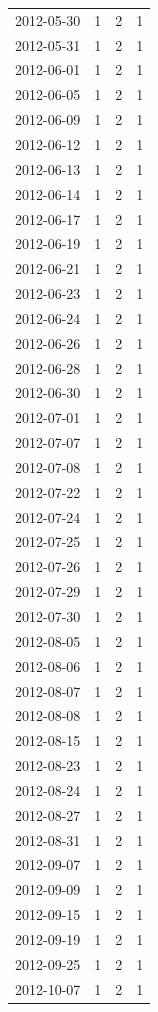 \begin{tabular}{lrrr}
2012-05-30 & 1 & 2 & 1 \\
2012-05-31 & 1 & 2 & 1 \\
2012-06-01 & 1 & 2 & 1 \\
2012-06-05 & 1 & 2 & 1 \\
2012-06-09 & 1 & 2 & 1 \\
2012-06-12 & 1 & 2 & 1 \\
2012-06-13 & 1 & 2 & 1 \\
2012-06-14 & 1 & 2 & 1 \\
2012-06-17 & 1 & 2 & 1 \\
2012-06-19 & 1 & 2 & 1 \\
2012-06-21 & 1 & 2 & 1 \\
2012-06-23 & 1 & 2 & 1 \\
2012-06-24 & 1 & 2 & 1 \\
2012-06-26 & 1 & 2 & 1 \\
2012-06-28 & 1 & 2 & 1 \\
2012-06-30 & 1 & 2 & 1 \\
2012-07-01 & 1 & 2 & 1 \\
2012-07-07 & 1 & 2 & 1 \\
2012-07-08 & 1 & 2 & 1 \\
2012-07-22 & 1 & 2 & 1 \\
2012-07-24 & 1 & 2 & 1 \\
2012-07-25 & 1 & 2 & 1 \\
2012-07-26 & 1 & 2 & 1 \\
2012-07-29 & 1 & 2 & 1 \\
2012-07-30 & 1 & 2 & 1 \\
2012-08-05 & 1 & 2 & 1 \\
2012-08-06 & 1 & 2 & 1 \\
2012-08-07 & 1 & 2 & 1 \\
2012-08-08 & 1 & 2 & 1 \\
2012-08-15 & 1 & 2 & 1 \\
2012-08-23 & 1 & 2 & 1 \\
2012-08-24 & 1 & 2 & 1 \\
2012-08-27 & 1 & 2 & 1 \\
2012-08-31 & 1 & 2 & 1 \\
2012-09-07 & 1 & 2 & 1 \\
2012-09-09 & 1 & 2 & 1 \\
2012-09-15 & 1 & 2 & 1 \\
2012-09-19 & 1 & 2 & 1 \\
2012-09-25 & 1 & 2 & 1 \\
2012-10-07 & 1 & 2 & 1 \\

\end{tabular}
